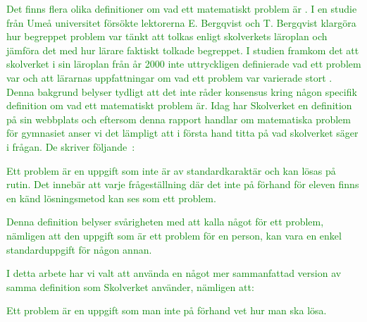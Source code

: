 
\textcolor{green}{Det finns flera olika definitioner om vad ett matematiskt problem är \cite{olikaDefinitioner}. I en studie från Umeå universitet försökte lektorerna E. Bergqvist och T. Bergqvist klargöra hur begreppet problem var tänkt att tolkas enligt skolverkets läroplan och jämföra det med hur lärare faktiskt tolkade begreppet. I studien framkom det att skolverket i sin läroplan från år 2000 inte uttryckligen definierade vad ett problem var och att lärarnas uppfattningar om vad ett problem var varierade stort \cite{problemVarierandeDef}. Denna bakgrund belyser tydligt att det inte råder konsensus kring någon specifik definition om vad ett matematiskt problem är. Idag har Skolverket en definition på sin webbplats och eftersom denna rapport handlar om matematiska problem för gymnasiet anser vi det lämpligt att i första hand titta på vad skolverket säger i frågan. De skriver följande~\cite{ProblemDef}:}

\begin{displayquote}
\textcolor{green}{Ett problem är en uppgift som inte är av standardkaraktär och kan lösas på rutin. Det innebär att varje frågeställning där det inte på förhand för eleven finns en känd lösningsmetod kan ses som ett problem.}
\end{displayquote}

\noindent\textcolor{green}{Denna definition belyser svårigheten med att kalla något för ett problem, nämligen att den uppgift som är ett problem för en person, kan vara en enkel standarduppgift för någon annan.} 

\textcolor{green}{I detta arbete har vi valt att använda en något mer sammanfattad version av samma definition som Skolverket använder, nämligen att:}

\begin{displayquote}
\textcolor{green}{Ett problem är en uppgift som man inte på förhand vet hur man ska lösa.}
\end{displayquote}

\noindent %

